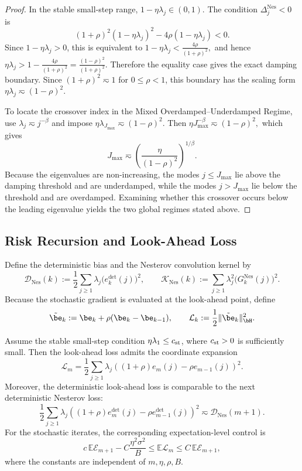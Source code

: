 \begin{proof}
In the stable small-step range, $1-\eta\lambda_j\in(0,1)$. The condition $\Delta_j^{\mathrm{Nes}}<0$ is
\[
    (1+\rho)^2(1-\eta\lambda_j)^2
    -4\rho(1-\eta\lambda_j)<0.
\]
Since $1-\eta\lambda_j>0$, this is equivalent to
$1-\eta\lambda_j<\frac{4\rho}{(1+\rho)^2},$
and hence
$\eta\lambda_j>1-\frac{4\rho}{(1+\rho)^2}=\frac{(1-\rho)^2}{(1+\rho)^2}.$
Therefore the equality case gives the exact damping boundary. Since $(1+\rho)^2\eqsim1$ for $0\le\rho<1$, this boundary has the scaling form $\eta\lambda_j\eqsim(1-\rho)^2$.

To locate the crossover index in the Mixed Overdamped--Underdamped Regime, use $\lambda_j\eqsim j^{-\beta}$ and impose
$\eta\lambda_{J_{\max}}\eqsim(1-\rho)^2.$
Then
$\eta J_{\max}^{-\beta}\eqsim(1-\rho)^2,$
which gives
\[
    J_{\max}
    \eqsim
    \left(\frac{\eta}{(1-\rho)^2}\right)^{1/\beta}.
\]
Because the eigenvalues are non-increasing, the modes $j\le J_{\max}$ lie above the damping threshold and are underdamped, while the modes $j>J_{\max}$ lie below the threshold and are overdamped. Examining whether this crossover occurs below the leading eigenvalue yields the two global regimes stated above.
\end{proof}

\subsection{Risk Recursion and Look-Ahead Loss}
\label{app:nes_risk_recursion}

Define the deterministic bias and the Nesterov convolution kernel by
\[
    \mathcal D_{\mathrm{Nes}}(k)
    :=
    \frac12\sum_{j\ge1}\lambda_j\bigl(e_k^{\mathrm{det}}(j)\bigr)^2,
    \qquad
    \mathcal K_{\mathrm{Nes}}(k)
    :=
    \sum_{j\ge1}\lambda_j^2\bigl(G_k^{\mathrm{Nes}}(j)\bigr)^2.
\]
Because the stochastic gradient is evaluated at the look-ahead point, define
\[
    \tilde\be_k:=\be_k+\rho(\be_k-\be_{k-1}),
    \qquad
    \mathcal L_k:=\frac12\|\tilde\be_k\|_{\bH}^2.
\]

\begin{lemma}
\label{lem:nes_lookahead_loss_control}
Assume the stable small-step condition \(\eta\lambda_1\le c_{\rm st}\), where \(c_{\rm st}>0\) is sufficiently small.  Then the look-ahead loss admits the coordinate expansion
\[
    \mathcal L_m
    =
    \frac12\sum_{j\ge1}\lambda_j
    \left((1+\rho)e_m(j)-\rho e_{m-1}(j)\right)^2.
\]
Moreover, the deterministic look-ahead loss is comparable to the next deterministic Nesterov loss:
\[
    \frac12\sum_{j\ge1}\lambda_j
    \left((1+\rho)e_m^{\mathrm{det}}(j)-\rho e_{m-1}^{\mathrm{det}}(j)\right)^2
    \eqsim
    \mathcal D_{\mathrm{Nes}}(m+1).
\]
For the stochastic iterates, the corresponding expectation-level control is
\[
    c\,\mathbb{E}\mathcal E_{m+1}-C\frac{\eta^2\sigma^2}{B}
    \le
    \mathbb{E}\mathcal L_m
    \le
    C\,\mathbb{E}\mathcal E_{m+1},
\]
where the constants are independent of \(m,\eta,\rho,B\).
\end{lemma}

